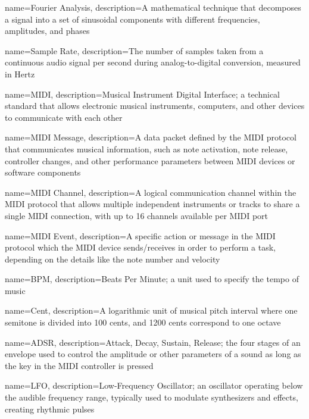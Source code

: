 {
    name={Fourier Analysis},
    description={A mathematical technique that decomposes a signal into a set of sinusoidal 
    components with different frequencies, amplitudes, and phases}
}

{
    name={Sample Rate},
    description={The number of samples taken from a continuous audio signal per second 
    during analog-to-digital conversion, measured in Hertz}
}

{
    name={MIDI},
    description={Musical Instrument Digital Interface; a technical standard that allows electronic
    musical instruments, computers, and other devices to communicate with each other}
}


{
    name={MIDI Message},
    description={A data packet defined by the MIDI protocol that communicates musical information, 
    such as note activation, note release, controller changes, and other performance parameters 
    between MIDI devices or software components}
}

{
    name={MIDI Channel},
    description={A logical communication channel within the MIDI protocol that allows multiple 
    independent instruments or tracks to share a single MIDI connection, with up to 16 channels 
    available per MIDI port}
}

{
    name={MIDI Event},
    description={A specific action or message in the MIDI protocol which the MIDI device sends/receives
        in order to perform a task, depending on the details like the note number and velocity}
}

{
    name={BPM},
    description={Beats Per Minute; a unit used to specify the tempo of music}
}


{
    name={Cent},
    description={A logarithmic unit of musical pitch interval where one semitone 
    is divided into 100 cents, and 1200 cents correspond to one octave}
}


{
    name={ADSR},
    description={Attack, Decay, Sustain, Release; the four stages of an envelope used to control the amplitude or other 
    parameters of a sound as long as the key in the MIDI controller is pressed}
}

{
    name={LFO},
    description={Low-Frequency Oscillator; an oscillator operating below the audible frequency range, 
    typically used to modulate synthesizers and effects, creating rhythmic pulses}
}

